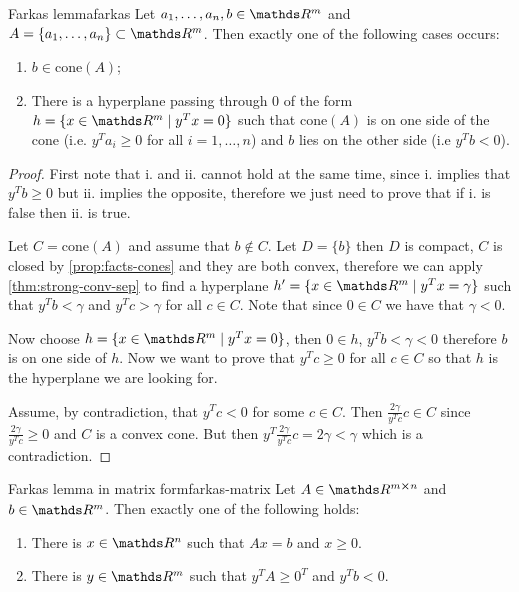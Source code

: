\documentclass[12pt]{extarticle}
\begin{document}
\begin{theorem}{Farkas lemma}{farkas}
	Let $a_1, \dots, a_n, b \in \R^m$ and $A = \{a_1, \dots, a_n\} \subset \R^m$.
	Then exactly one of the following cases occurs:
	\begin{enumerate}[label=\roman*.]
		\item $b \in \mathrm{cone}(A)$;
		\item There is a hyperplane passing through $0$ of the form $h = \{x \in \R^m \mid y^Tx = 0\}$
		      such that $\mathrm{cone}(A)$ is on one side of the cone
		      (i.e. $y^T a_i \geq 0$ for all $i = 1, \dots, n$) and $b$ lies on the other side
		      (i.e $y^T b < 0$).
	\end{enumerate}
\end{theorem}

\begin{proof}
	First note that i. and ii. cannot hold at the same time, since i. implies that $y^T b \geq 0$
	but ii. implies the opposite, therefore we just need to prove that
	if i. is false then ii. is true.

	Let $C = \mathrm{cone}(A)$ and assume that $b \notin C$.
	Let $D = \{b\}$ then $D$ is compact, $C$ is closed by \cref{prop:facts-cones} and they are both
	convex, therefore we can apply \cref{thm:strong-conv-sep} to find a hyperplane
	$h' = \{ x \in \R^m \mid y^T x = \gamma\}$ such that $y^T b < \gamma$ and $y^T c > \gamma$
	for all $c \in C$. Note that since $0 \in C$ we have that $\gamma < 0$.

	Now choose $h = \{ x \in \R^m \mid y^T x = 0\}$, then $0 \in h$, $y^T b < \gamma < 0$
	therefore $b$ is on one side of $h$.
	Now we want to prove that $y^Tc \geq 0$ for all $c \in C$ so that $h$ is the hyperplane we are
	looking for.

	Assume, by contradiction, that $y^T c < 0$ for some $c \in C$.
	Then $\frac{2 \gamma}{y^T c} c \in C$ since $\frac{2 \gamma}{y^T c} \geq 0$ and
	$C$ is a convex cone.
	But then $y^T \frac{2 \gamma}{y^T c} c = 2 \gamma < \gamma$ which is a contradiction.
\end{proof}

\begin{corollary}{Farkas lemma in matrix form}{farkas-matrix}
	Let $A \in \R^{m \cross n}$ and $b \in \R^m$.
	Then exactly one of the following holds:
	\begin{enumerate}[label=\roman*.]
		\item There is $x \in \R^n$ such that $Ax = b$ and $x \geq 0$.
		\item There is $y \in \R^m$ such that $y^T A \geq 0^T$ and $y^T b < 0$.
	\end{enumerate}
\end{corollary}
\end{document}
